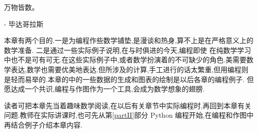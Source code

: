 \documentclass[main.tex]{subfiles}
\begin{document}
\begin{flushright}
	\begin{kaishu}
		万物皆数。\\
	\end{kaishu}
	- 毕达哥拉斯
\end{flushright}

本章有两个目的.一是为编程作些数学铺垫,是漫谈和热身,算不上是在严格意义上的数学准备.
二是通过一些实际例子说明,在与时俱进的今天,编程即使
在纯数学学习中也不是可有可无.在这些实际例子中,或者数学扮演着的不可缺少的角色.美需要数学表达,数学也需要优美地表达.但所涉及的计算,手工进行的话太繁重,但用编程则是轻而易举的.本章的中的一些数据的生成和图表的绘制是以后各章的编程例子.
但愿达成一个共识,编程与作图作为一个工具,会成为数学想象的翅膀.

读者可把本章先当着趣味数学阅读,在以后有关章节中实际编程时,再回到本章有关问题.教师在实际讲课时,也可先从第\ref{partII}部分 Python 编程开始,在编程和作图中再结合例子介绍本章内容.
\end{document}
